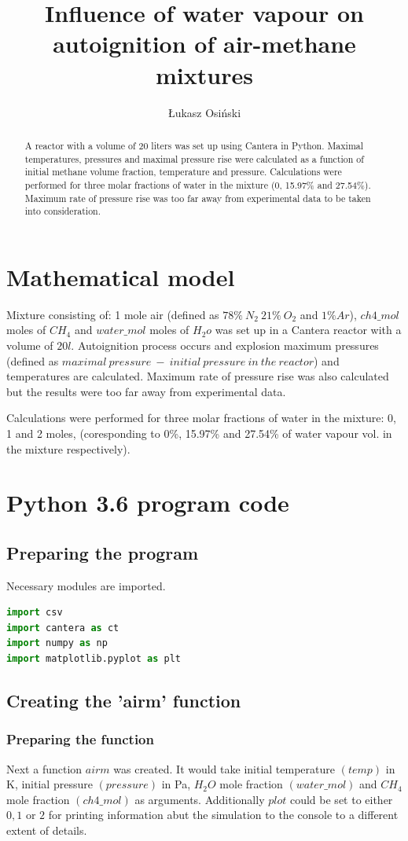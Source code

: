 \documentclass[a4paper]{article}
\title{Influence of water vapour on autoignition of air-methane mixtures}
\author{Łukasz Osiński}
\begin{document}
\maketitle

\begin{abstract}
A reactor with a volume of 20 liters was set up using Cantera in Python. Maximal temperatures, pressures and maximal pressure rise were calculated as a function of initial methane volume fraction, temperature and pressure. Calculations were performed for three molar fractions of water in the mixture (0, 15.97\% and 27.54\%). Maximum rate of pressure rise was too far away from experimental data to be taken into consideration.
\end{abstract}

\section{Mathematical model}
Mixture consisting of: 1 mole air (defined as $78\%\ N_2\ 21\%\ O_2$ and $1\%Ar$), $ch4\_mol$ moles of $CH_4$ and $water\_mol$ moles of $H_2o$ was set up in a Cantera reactor with a volume of $20 l$. Autoignition process occurs and explosion maximum pressures (defined as $maximal\ pressure\ -\ initial\ pressure\ in\ the\ reactor$) and temperatures are calculated. Maximum rate of pressure rise was also calculated but the results were too far away from experimental data.

Calculations were performed for three molar fractions of water in the mixture: 0, 1 and 2 moles, (coresponding to 0\%, 15.97\% and 27.54\% of water vapour vol. in the mixture respectively).

\section{Python 3.6 program code}
\subsection{Preparing the program}
Necessary modules are imported.
\begin{lstlisting}[language=python]
import csv
import cantera as ct
import numpy as np
import matplotlib.pyplot as plt
\end{lstlisting}
\subsection{Creating the 'airm' function}
\subsubsection{Preparing the function}
Next a function $airm$ was created. It would take initial temperature $(temp)$ in K, initial pressure $(pressure)$ in Pa, $H_2O$ mole fraction $(water\_mol)$ and $CH_4$ mole fraction $(ch4\_mol)$ as arguments. Additionally $plot$ could be set to either $0, 1$ or $2$ for printing information abut the simulation to the console to a different extent of details.
\end{document}
